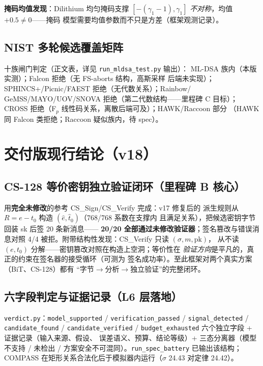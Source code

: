 \documentclass[11pt,a4paper]{ctexart}
\begin{document}
\textbf{掩码均值发现}：Dilithium 均匀掩码支撑
$[-(\gamma_1{-}1),\gamma_1]$ \emph{不对称}，均值 $+0.5\ne0$——掩码
模型需要均值参数而不只是方差（框架观测记录）。

\subsection{NIST 多轮候选覆盖矩阵}

十族闸门判定（正文表，详见 \texttt{run\_mldsa\_test.py} 输出）：
ML-DSA 族内（本版实测）；Falcon 拒绝（无 FS-aborts 结构，高斯采样
后端未实现）；SPHINCS+/Picnic/FAEST 拒绝（无代数关系）；Rainbow/
GeMSS/MAYO/UOV/SNOVA 拒绝（第二代数结构——里程碑 C 目标）；CROSS
拒绝（F$_p$ 线性码关系，离散后端可及）；HAWK/Raccoon 部分
（HAWK 同 Falcon 类拒绝；Raccoon 疑似族内，待 spec）。

\section{交付版现行结论（v18）}

\subsection{CS-128 等价密钥独立验证闭环（里程碑 B 核心）}

用\textbf{完全未修改}的参考 CS\_Sign/CS\_Verify 完成：v17 修复后的
派生规则从 $R=e-t_0$ 构造 $(\hat e,\hat t_0)$（768/768 系数在支撑内
且满足关系），把候选密钥字节回装 sk 后签 20 条新消息——
\textbf{20/20 全部通过未修改验证器}；签名篡改与错误消息对照 4/4
被拒。附带结构性发现：CS\_Verify 只读 $(\sigma,m,\mathrm{pk})$，
从不读 $(e,t_0)$ 分解——密钥篡改对照在构造上空洞；等价性在
\emph{验证方向}是平凡的，真正的约束在签名器的接受循环（可测为
签名成功率）。至此框架对两个真实方案（BiT、CS-128）都有
``字节$\to$分析$\to$独立验证''的完整闭环。

\subsection{六字段判定与证据记录（L6 层落地）}

\texttt{verdict.py}：\texttt{model\_supported} /
\texttt{verification\_passed} / \texttt{signal\_detected} /
\texttt{candidate\_found} / \texttt{candidate\_verified} /
\texttt{budget\_exhausted} 六个独立字段 + 证据记录（输入来源、假设、
误差语义、预算、结论等级）+ 三态分离器（模型不支持 / 未检出 /
方案安全不可混同）。\texttt{run\_spec\_battery} 已输出该结构；
COMPASS 在矩形关系合法化后于模拟器内运行（$\sigma$ 24.43 对定律
24.42）。
\end{document}
